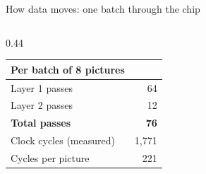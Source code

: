 \documentclass[aspectratio=169,10pt,t]{beamer}
\begin{document}
\begin{frame}{How data moves: one batch through the chip}
\begin{columns}[T]
\begin{column}{0.44\textwidth}
      \vspace{2pt}
      \footnotesize
      \begin{tabular}{@{}lr@{}}
        \toprule
        \textbf{Per batch of 8 pictures} & \\
        \midrule
        Layer 1 passes & 64\\
        Layer 2 passes & 12\\
        \textbf{Total passes} & \textbf{76}\\
        Clock cycles (measured) & 1,771\\
        Cycles per picture & 221\\
        \bottomrule
      \end{tabular}
    \end{column}
  \end{columns}
\end{frame}
\end{document}
